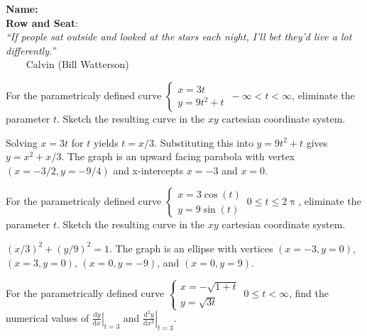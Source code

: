 \documentclass[12pt,fleqn,answers]{exam}
\newcommand{\class}{MATH 202, Spring \the\year}
\begin{document}
\large
\noindent\makebox[3.0truein][l]{\textbf{\class}}
\textbf{Name:} \hrulefill \\
\noindent {}
\textbf{Row and Seat}:\hrulefill\\





\noindent \emph{“If people sat outside and looked at 
the stars each night, I’ll bet they’d live a lot differently.”}\\
  $\phantom{xxx}$ \hfill {\sc Calvin (Bill Watterson)}


\begin{questions} 
    
  
\question For the parametricaly defined curve $\begin{cases}
      x = 3 t \\ y = 9 t^2 + t \end{cases} \, -\infty < t < \infty$,
      eliminate the parameter $t$. Sketch the resulting curve in
      the $xy$ cartesian coordinate system.

\begin{solution}[2.5in] Solving $  x = 3 t$ for $t$ yields $t = x/3$.
  Substituting this into  \mbox{$y = 9 t^2 + t$} gives $y = x^2 + x / 3$.
  The graph is an upward facing parabola with vertex \\
  \mbox{$(x=-3/2, y=-9/4)$}
  and x-intercepts $x=-3$ and $x=0$.
\end{solution}

\question For the parametricaly defined curve $\begin{cases}
    x = 3 \cos(t) \\ y = 9 \sin(t) \end{cases} \, 0 \leq  t \leq 2 \uppi$,
    eliminate the parameter $t$. Sketch the resulting curve in
    the $xy$ cartesian coordinate system.

\begin{solution}[2.5in]
  $(x/3)^2 + (y/9)^2 = 1$.  The graph is an ellipse with
  vertices $(x=-3,y=0)$,$(x=3,y=0)$, $(x=0,y=-9)$, and $(x=0,y=9)$.
\end{solution}

\newpage


\question For the parametrically defined curve 
$\displaystyle \begin{cases} x = -\sqrt{1+t} \\ y = \sqrt{3t} 
\end{cases} \, 0 \leq t < \infty$, find the numerical values 
of $\left . \frac{\mathrm{d} y}{\mathrm{d}x} \right |_{t=3}$
and $\left . \frac{\mathrm{d}^2 y}{\mathrm{d} x^2} \right |_{t=3}$.


\end{questions}
\end{document}
